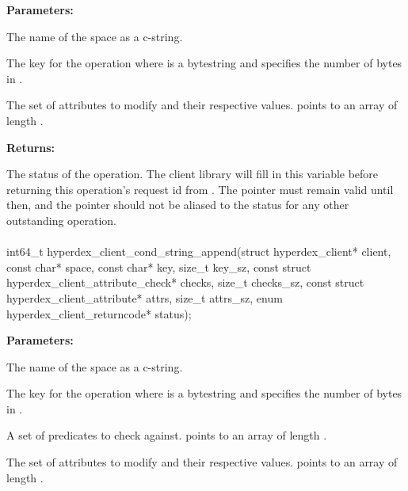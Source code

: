 \noindent\textbf{Parameters:}
\begin{description}[labelindent=\widthof{{\code{attrs}, \code{attrs\_sz}}},leftmargin=*,noitemsep,nolistsep,align=right]
\item[\code{space}] The name of the space as a c-string.
\item[\code{key}, \code{key\_sz}] The key for the operation where  is a bytestring and  specifies the number of bytes in .
\item[\code{attrs}, \code{attrs\_sz}] The set of attributes to modify and their respective values.   points to an array of length .
\end{description}

\noindent\textbf{Returns:}
\begin{description}[labelindent=\widthof{{\code{status}}},leftmargin=*,noitemsep,nolistsep,align=right]
\item[\code{status}] The status of the operation.  The client library will fill in this variable before returning this operation's request id from .  The pointer must remain valid until then, and the pointer should not be aliased to the status for any other outstanding operation.
\end{description}

\paragraph{}
\label{api:c:cond_string_append}
\begin{ccode}
int64_t hyperdex_client_cond_string_append(struct hyperdex_client* client,
                const char* space,
                const char* key, size_t key_sz,
                const struct hyperdex_client_attribute_check* checks, size_t checks_sz,
                const struct hyperdex_client_attribute* attrs, size_t attrs_sz,
                enum hyperdex_client_returncode* status);
\end{ccode}
\funcdesc 

\noindent\textbf{Parameters:}
\begin{description}[labelindent=\widthof{{\code{checks}, \code{checks\_sz}}},leftmargin=*,noitemsep,nolistsep,align=right]
\item[\code{space}] The name of the space as a c-string.
\item[\code{key}, \code{key\_sz}] The key for the operation where  is a bytestring and  specifies the number of bytes in .
\item[\code{checks}, \code{checks\_sz}] A set of predicates to check against.   points to an array of length .
\item[\code{attrs}, \code{attrs\_sz}] The set of attributes to modify and their respective values.   points to an array of length .
\end{description}

